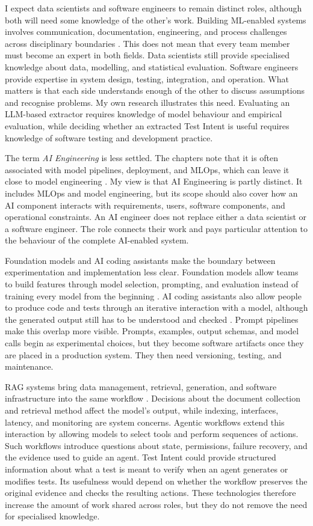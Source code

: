 I expect data scientists and software engineers to remain distinct roles, although both will need some knowledge of the other's work. Building ML-enabled systems involves communication, documentation, engineering, and process challenges across disciplinary boundaries \cite{DBLP:conf/icse/NaharZLK22}. This does not mean that every team member must become an expert in both fields. Data scientists still provide specialised knowledge about data, modelling, and statistical evaluation. Software engineers provide expertise in system design, testing, integration, and operation. What matters is that each side understands enough of the other to discuss assumptions and recognise problems. My own research illustrates this need. Evaluating an LLM-based extractor requires knowledge of model behaviour and empirical evaluation, while deciding whether an extracted Test Intent is useful requires knowledge of software testing and development practice.

The term \emph{AI Engineering} is less settled. The chapters note that it is often associated with model pipelines, deployment, and MLOps, which can leave it close to model engineering \cite{K:25}. My view is that AI Engineering is partly distinct. It includes MLOps and model engineering, but its scope should also cover how an AI component interacts with requirements, users, software components, and operational constraints. An AI engineer does not replace either a data scientist or a software engineer. The role connects their work and pays particular attention to the behaviour of the complete AI-enabled system.

Foundation models and AI coding assistants make the boundary between experimentation and implementation less clear. Foundation models allow teams to build features through model selection, prompting, and evaluation instead of training every model from the beginning \cite{K:25}. AI coding assistants also allow people to produce code and tests through an iterative interaction with a model, although the generated output still has to be understood and checked \cite{DBLP:journals/pacmpl/BarkeJP23}. Prompt pipelines make this overlap more visible. Prompts, examples, output schemas, and model calls begin as experimental choices, but they become software artifacts once they are placed in a production system. They then need versioning, testing, and maintenance.

RAG systems bring data management, retrieval, generation, and software infrastructure into the same workflow \cite{K:25}. Decisions about the document collection and retrieval method affect the model's output, while indexing, interfaces, latency, and monitoring are system concerns. Agentic workflows extend this interaction by allowing models to select tools and perform sequences of actions. Such workflows introduce questions about state, permissions, failure recovery, and the evidence used to guide an agent. Test Intent could provide structured information about what a test is meant to verify when an agent generates or modifies tests. Its usefulness would depend on whether the workflow preserves the original evidence and checks the resulting actions. These technologies therefore increase the amount of work shared across roles, but they do not remove the need for specialised knowledge.

